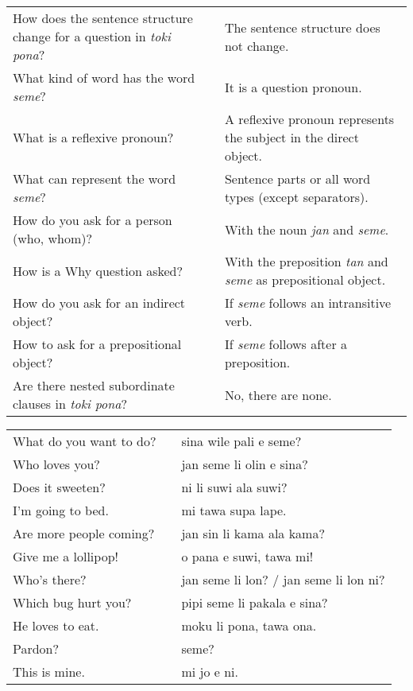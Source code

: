 \begin{supertabular}{p{5,5cm}|ll}
How does the sentence structure change for a question in \textit{toki pona}? && The sentence structure does not change. \\ %
What kind of word has the word \textit{seme}? && It is a question pronoun.  \\ %
What is a reflexive pronoun? && A reflexive pronoun represents the subject in the direct object. \\ %
What can represent the word \textit{seme}? && Sentence parts or all word types (except separators).  \\ %
How do you ask for a person (who, whom)? && With the noun \textit{jan} and \textit{seme}. \\ %
How is a Why question asked? && With the preposition \textit{tan} and \textit{seme} as prepositional object. \\ %
How do you ask for an indirect object? && If \textit{seme} follows an intransitive verb. \\ %
How to ask for a prepositional object? && If \textit{seme} follows after a preposition. \\ %
Are there nested subordinate clauses in \textit{toki pona}? && No, there are none. \\ %
\end{supertabular}

\begin{supertabular}{p{5,5cm}|ll}
What do you want to do?  && sina wile pali e seme? \\ %
Who loves you?  && jan seme li olin e sina? \\ %
Does it sweeten? && ni li suwi ala suwi? \\ %
I'm going to bed.  && mi tawa supa lape. \\ %
Are more people coming?  && jan sin li kama ala kama? \\ %
Give me a lollipop!  && o pana e suwi, tawa mi! \\ %
Who's there?  && jan seme li lon? / jan seme li lon ni? \\ %
Which bug hurt you?  && pipi seme li pakala e sina? \\ %
He loves to eat.  && moku li pona, tawa ona. \\ %
Pardon? && seme? \\ %
This is mine.  && mi jo e ni. \\ %
\end{supertabular} 

